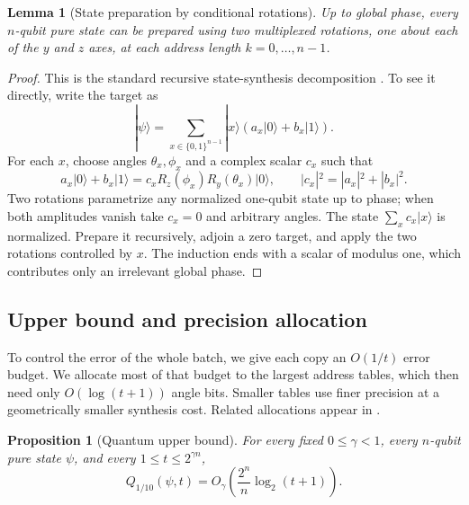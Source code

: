 \documentclass[11pt]{article}
\newtheorem{lemma}[lemma]{Lemma}
\newtheorem{proposition}[proposition]{Proposition}
\newcommand{\bits}{\{0,1\}}
\begin{document}
\begin{lemma}[State preparation by conditional rotations]
\label{lem:state-rotations}
Up to global phase, every $n$-qubit pure state can be prepared using
two multiplexed rotations, one about each of the $y$ and $z$ axes,
at each address length $k=0,\ldots,n-1$.
\end{lemma}

\begin{proof}
This is the standard recursive state-synthesis decomposition
\cite{ShendeBullockMarkov2006,Kretschmer2023}.  To see it directly,
write the target as
\[
 |\psi\rangle=\sum_{x\in\bits^{n-1}}|x\rangle
                   (a_x|0\rangle+b_x|1\rangle).
\]
For each $x$, choose angles $\theta_x,\phi_x$ and a complex scalar
$c_x$ such that
\[
 a_x|0\rangle+b_x|1\rangle
   =c_x R_z(\phi_x)R_y(\theta_x)|0\rangle,
 \qquad |c_x|^2=|a_x|^2+|b_x|^2.
\]
Two rotations parametrize any normalized one-qubit state up to phase;
when both amplitudes vanish take $c_x=0$ and arbitrary angles.
The state $\sum_x c_x|x\rangle$ is normalized.  Prepare it recursively,
adjoin a zero target, and apply the two rotations controlled by $x$.
The induction ends with a scalar of modulus one, which contributes
only an irrelevant global phase.
\end{proof}

\subsection{Upper bound and precision allocation}

To control the error of the whole batch, we give each copy an $O(1/t)$
error budget.  We allocate most of that budget to the largest address
tables, which then need only $O(\log(t+1))$ angle bits.  Smaller tables
use finer precision at a geometrically smaller synthesis cost.  Related
allocations appear in \cite[Appendix~B]{GossetKothariWu2026}.

\begin{proposition}[Quantum upper bound]\label{prop:quantum-upper}
For every fixed $0\le\gamma<1$, every $n$-qubit pure state $\psi$,
and every $1\le t\le2^{\gamma n}$,
\[
 Q_{1/10}(\psi,t)
   =O_\gamma\!\left(\frac{2^n}{n}\log_2(t+1)\right).
\]
\end{proposition}
\end{document}
